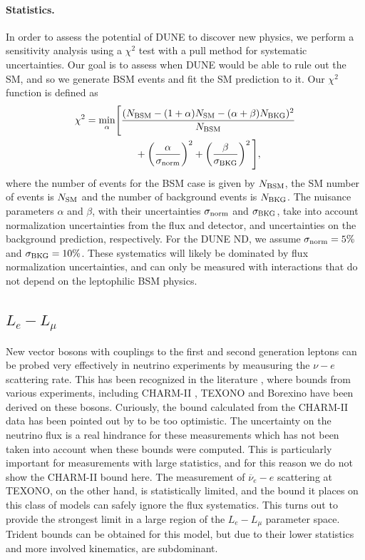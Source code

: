 \paragraph{Statistics.} 
In order to assess the potential of DUNE to discover new physics, we perform a sensitivity analysis using a $\chi^2$ test with a pull method for systematic uncertainties. Our goal is to assess when DUNE would be able to rule out the SM, and so we generate BSM events and fit the SM prediction to it. Our $\chi^2$ function is defined as
%
\begin{align}
  \chi^2 = \min_{\alpha} &\Bigg[\frac{ (N_{\text{BSM}} - (1+\alpha) N_{\text{SM}}-(\alpha+\beta) N_{\text{BKG}})^2 }{ N_{\text{BSM}}} \nonumber \\ &\quad \quad+ \left(\frac{\alpha}{\sigma_{\rm norm}}\right)^2 + \left(\frac{\beta}{\sigma_{\rm BKG}}\right)^2 \Bigg],
\end{align}
%
where the number of events for the BSM case is given by $N_{\rm BSM}$, the SM number of events is $N_{\rm SM}$ and the number of background events is $N_{\rm BKG}$. The nuisance parameters $\alpha$ and $\beta$, with their uncertainties $\sigma_{\rm norm}$ and  $\sigma_{\rm BKG}$, take into account normalization uncertainties from the flux and detector, and uncertainties on the background prediction, respectively. For the DUNE ND, we assume $\sigma_{\rm norm} = 5\%$ and $\sigma_{\rm BKG} = 10\%$. These systematics will likely be dominated by flux normalization uncertainties, and can only be measured with interactions that do not depend on the leptophilic BSM physics.

\subsection{\boldmath${L_e - L_\mu}$ \label{sec:le_lbeta}}

New vector bosons with couplings to the first and second generation leptons can be probed very effectively in neutrino experiments by meausuring the $\nu-e$ scattering rate. This has been recognized in the literature \cite{Bilmis:2015lja,Lindner:2018kjo,Bauer:2018onh}, where bounds from various experiments, including CHARM-II \cite{Vilain:1994qy}, TEXONO \cite{Wong:2006nx,Deniz:2009mu,Chen:2014dsa} and Borexino \cite{Bellini:2011rx} have been derived on these bosons. Curiously, the bound calculated from the CHARM-II data has been pointed out by  to be too optimistic. The uncertainty on the neutrino flux is a real hindrance for these measurements which has not been taken into account when these bounds were computed. This is particularly important for measurements with large statistics, and for this reason we do not show the CHARM-II bound here. The measurement of $\overline{\nu}_e - e$ scattering at TEXONO, on the other hand, is statistically limited, and the bound it places on this class of models can safely ignore the flux systematics. This turns out to provide the strongest limit in a large region of the ${L_e - L_\mu}$ parameter space. Trident bounds can be obtained for this model, but due to their lower statistics and more involved kinematics, are subdominant.

